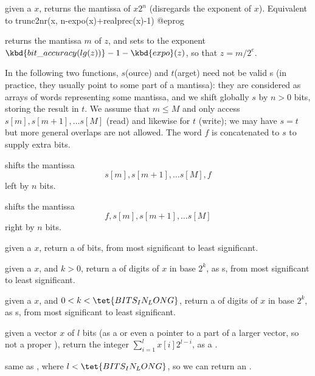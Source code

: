  given a  $x$, returns
the mantissa of $x 2^n$ (disregards the exponent of $x$). Equivalent to
\bprog
  trunc2nr(x, n-expo(x)+realprec(x)-1)
@eprog

 returns the mantissa $m$ of $z$, and
sets  to the exponent $\kbd{bit\_accuracy(lg(z))}-1-\kbd{expo}(z)$,
so that $z = m / 2^e$.

 In the following two functions, $s$(ource) and $t$(arget)
need not be valid s (in practice, they usually point to some part of a
 mantissa): they are considered as arrays of words representing some
mantissa, and we shift globally $s$ by $n > 0$ bits, storing the result in
$t$. We assume that $m\leq M$ and only access $s[m], s[m+1],\ldots s[M]$
(read) and likewise for $t$ (write); we may have $s = t$ but more general
overlaps are not allowed. The word $f$ is concatenated to $s$ to supply extra
bits.

shifts the mantissa
$$s[m], s[m+1],\ldots s[M], f$$
left by $n$ bits.

shifts the mantissa
$$f, s[m], s[m+1],\ldots s[M]$$
right by $n$ bits.


 given a  $x$, return a  of
bits, from most significant to least significant.

 given a  $x$, and
$k > 0$, return a  of digits of $x$ in base $2^k$, as s, from
most significant to least significant.

 given a  $x$, and $0 < k <
\tet{BITS_IN_LONG}$, return a  of digits of $x$ in base $2^k$, as
s, from most significant to least significant.

 given a vector $x$ of $l$ bits (as a
 or even a pointer to a part of a larger vector, so not a
proper ), return the integer $\sum_{i = 1}^l x[i] 2^{l-i}$, as a
.

 same as , where
$l < \tet{BITS_IN_LONG}$, so we can return an .

